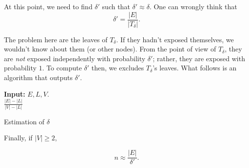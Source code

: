 At this point, we need to find $\delta'$ such that $\delta' \approx \delta$. One can wrongly think that
\begin{equation}
	\delta' = \frac{|E|}{|T_\delta|}.
\end{equation}

The problem here are the leaves of $T_\delta$. If they hadn't exposed themselves, we wouldn't know about them (or other nodes). From the point of view of $T_\delta$, they are \emph{not} exposed independently with probability $\delta'$; rather, they are exposed with probability $1$. To compute $\delta'$ then, we excludes $T_\delta$'s leaves. What follows is an algorithm that outputs $\delta'$.

\begin{algorithm}
\textbf{Input:} $E, L, V$.\\
\Return $\frac{|E| - |L|}{|V|-|L|}$

\caption{Estimation of $\delta$}
\end{algorithm}

Finally, if $|V| \geq 2$,

\begin{equation}
	 n \approx \frac{|E|}{\delta'}.
\end{equation}

